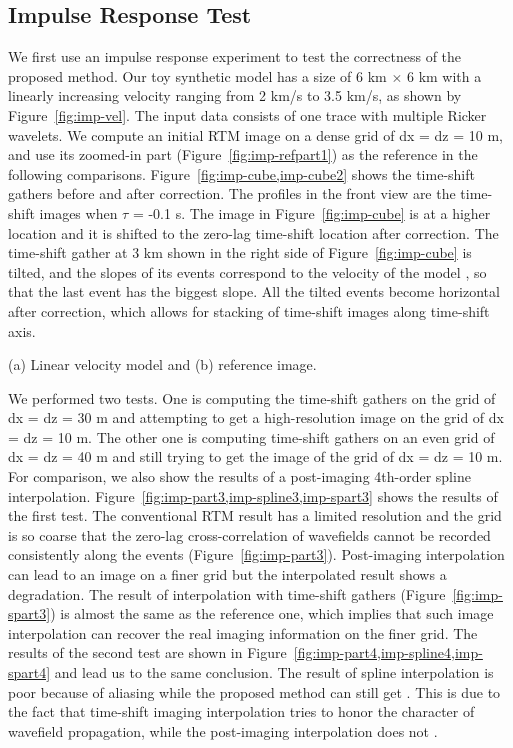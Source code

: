 \subsection{Impulse Response Test}

We first use an impulse response experiment to test the correctness of the proposed method.
Our toy synthetic model has a size of 6 km $\times$ 6 km with a linearly increasing velocity ranging from 2 km/s to 3.5 km/s, as shown by Figure~\ref{fig:imp-vel}.
The input data consists of one trace with multiple Ricker wavelets.
We compute an initial RTM image on a dense grid of dx = dz = 10 m,
and use its zoomed-in part (Figure~\ref{fig:imp-refpart1}) as the reference in the following comparisons.
Figure~\ref{fig:imp-cube,imp-cube2} shows the time-shift gathers before and after correction.
The profiles in the front view are the time-shift images when $\tau$ = -0.1 s.
The image in Figure~\ref{fig:imp-cube} is at a higher location 
and it is shifted to the zero-lag time-shift location after correction.
The time-shift gather at 3 km shown in the right side of Figure~\ref{fig:imp-cube} is tilted, and the slopes of
its events correspond to the velocity of the model \cite[]{sava06,xu14}, so that the last event has the biggest slope.
All the tilted events become horizontal after correction, which allows for stacking of time-shift images along time-shift axis.

{(a) Linear   velocity model and (b) reference image.}

We performed two tests. One is computing the time-shift gathers on the grid of dx = dz = 30 m 
and attempting to get a high-resolution image on the grid of dx = dz = 10 m.
The other one is computing time-shift gathers on an even   grid of dx = dz = 40 m 
and still trying to get the image of the grid of dx = dz = 10 m.
For comparison, we also show the results of a post-imaging 4th-order spline interpolation. 
Figure~\ref{fig:imp-part3,imp-spline3,imp-spart3} shows the results of the first test. 
The conventional RTM result has a limited resolution and the grid is so coarse that
the zero-lag cross-correlation of wavefields cannot be recorded consistently along the events (Figure~\ref{fig:imp-part3}). 
Post-imaging interpolation can lead to an image on a finer grid but the interpolated result shows a degradation.
The result of interpolation with time-shift gathers (Figure~\ref{fig:imp-spart3}) is almost the same as the reference one, which implies that such image interpolation can recover the real imaging information on the finer grid.
The results of the second test are shown in Figure~\ref{fig:imp-part4,imp-spline4,imp-spart4} and lead us to the same conclusion.
The result of spline interpolation is poor because of aliasing while the proposed method can still get  .
This is due to the fact that time-shift imaging interpolation tries to honor the character of wavefield propagation, 
while the post-imaging interpolation does not \cite[]{ng07gp}.

